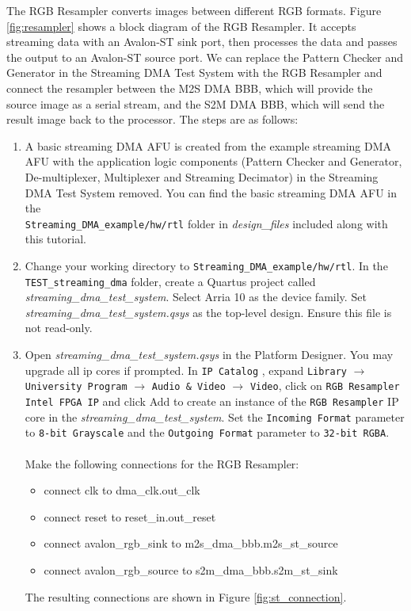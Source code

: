 \documentclass[11pt, twoside, pdftex]{article}
\begin{document}
\noindent
The RGB Resampler converts images between different RGB formats. Figure \ref{fig:resampler} shows a block diagram of the RGB Resampler. It accepts streaming data with an Avalon-ST sink port, then processes the data and passes the output to an Avalon-ST source port. We can replace the Pattern Checker and Generator in the Streaming DMA Test System with the RGB Resampler and connect the resampler between the M2S DMA BBB, which will provide the source image as a serial stream, and the S2M DMA BBB, which will send the result image back to the processor. The steps are as follows:\\
\begin{enumerate}
    \item A basic streaming DMA AFU is created from the example streaming DMA AFU with the application logic components (Pattern Checker and Generator, De-multiplexer, Multiplexer and Streaming Decimator) in the Streaming DMA Test System removed. You can find the basic streaming DMA AFU in the\\ \texttt{Streaming\_DMA\_example/hw/rtl} folder in {\it design\_files} included along with this tutorial. 
    
    \item Change your working directory to \texttt{Streaming\_DMA\_example/hw/rtl}. In the \texttt{TEST\_streaming\_dma} folder, create a Quartus project called \emph{streaming\_dma\_test\_system}. Select Arria 10 as the device family. Set \emph{streaming\_dma\_test\_system.qsys} as the top-level design. Ensure this file is not read-only.
    
    \item Open \emph{streaming\_dma\_test\_system.qsys} in the Platform Designer. You may upgrade all ip cores if prompted. In \texttt{IP Catalog} , expand \texttt{Library} $\rightarrow$ \texttt{University Program} $\rightarrow$ \texttt{Audio \& Video} $\rightarrow$ \texttt{Video}, click on \texttt{RGB Resampler Intel FPGA IP} and click Add to create an instance of the \texttt{RGB Resampler} IP core in the \emph{streaming\_dma\_test\_system}. Set the \texttt{Incoming Format} parameter to \texttt{8-bit Grayscale} and the \texttt{Outgoing Format} parameter to \texttt{32-bit RGBA}.\\
    \\
    Make the following connections for the RGB Resampler:
     \begin{itemize}
            \item connect clk to dma\_clk.out\_clk
            \item connect reset to reset\_in.out\_reset
            \item connect avalon\_rgb\_sink to m2s\_dma\_bbb.m2s\_st\_source
            \item connect avalon\_rgb\_source to s2m\_dma\_bbb.s2m\_st\_sink
        \end{itemize}
        The resulting connections are shown in Figure \ref{fig:st_connection}.
        

\end{enumerate}
\end{document}
